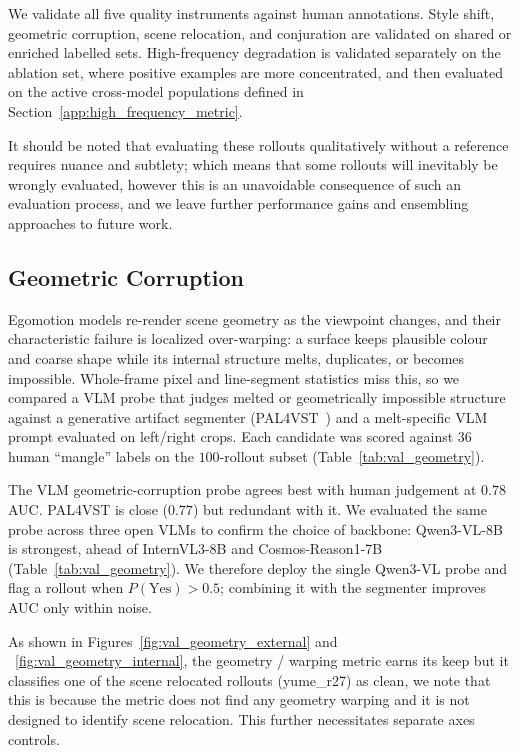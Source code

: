We validate all five quality instruments against human annotations. Style
shift, geometric corruption, scene relocation, and conjuration are validated
on shared or enriched labelled sets. High-frequency degradation is validated
separately on the ablation set, where positive examples are more concentrated,
and then evaluated on the active cross-model populations defined in
Section~\ref{app:high_frequency_metric}.

It should be noted that evaluating these rollouts qualitatively without a reference requires nuance and subtlety; which means that some rollouts will inevitably be wrongly evaluated, however this is an unavoidable consequence of such an evaluation process, and we leave further performance gains and ensembling approaches to future work.

\subsection{Geometric Corruption}
\label{app:val_geometry}

Egomotion models re-render scene geometry as the viewpoint changes, and their
characteristic failure is localized over-warping: a surface keeps plausible
colour and coarse shape while its internal structure melts, duplicates, or
becomes impossible. Whole-frame pixel and line-segment statistics miss this, so
we compared a VLM probe that judges melted or geometrically impossible structure
against a generative artifact segmenter (PAL4VST~\cite{pal}) and a melt-specific
VLM prompt evaluated on left/right crops. Each candidate was scored against $36$
human ``mangle'' labels on the $100$-rollout subset
(Table~\ref{tab:val_geometry}).

The VLM geometric-corruption probe agrees best with human judgement at $0.78$
AUC. PAL4VST is close ($0.77$) but redundant with it. We evaluated the same
probe across three open VLMs to confirm the choice of backbone: Qwen3-VL-8B is
strongest, ahead of InternVL3-8B and Cosmos-Reason1-7B
(Table~\ref{tab:val_geometry}). We therefore deploy the single Qwen3-VL probe
and flag a rollout when $P(\mathrm{Yes})>0.5$; combining it with the segmenter
improves AUC only within noise.

As shown in Figures~\ref{fig:val_geometry_external} and ~\ref{fig:val_geometry_internal}, the geometry / warping metric earns its keep but it classifies one of the scene relocated rollouts (yume\_r27) as clean, we note that this is because the metric does not find any geometry warping and it is not designed to identify scene relocation. This further necessitates separate axes controls.

